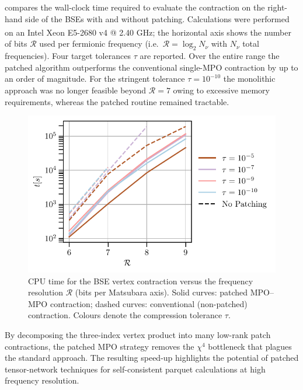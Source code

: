  compares the wall-clock time required to evaluate the contraction on the right-hand side of the BSEs with and without patching.  
Calculations were performed on an
Intel\textsuperscript{\textregistered} Xeon\textsuperscript{\textregistered}
E5-2680 v4 @ 2.40 GHz; the horizontal axis shows the number of bits \(\mathcal R\) used per fermionic frequency (i.e.\ \(\mathcal R=\log_{2}N_{\nu}\) with $N_{\nu}$ total frequencies). Four target tolerances \(\tau\) are reported.  
Over the entire range the patched algorithm outperforms the conventional single-MPO contraction by up to an order of magnitude.  
For the stringent tolerance \(\tau=10^{-10}\) the monolithic approach was no longer feasible beyond \(\mathcal R=7\) owing to excessive memory requirements, whereas the patched routine remained tractable.


\begin{figure}[ht!]
    \includegraphics{figures/BSEContraction_R_vs_time_comparTCI.pdf}
    \caption{CPU time for the BSE vertex contraction versus the frequency resolution
    \(\mathcal R\) (bits per Matsubara axis).
    Solid curves: patched MPO–MPO contraction;
    dashed curves: conventional (non-patched) contraction. Colours denote the compression tolerance \(\tau\).}
    \label{fig:BSEresult}
\end{figure}

By decomposing the three-index vertex product into many low-rank patch contractions, the patched MPO strategy removes the \(\chi^{4}\) bottleneck that plagues the standard approach.  
The resulting speed-up highlights the potential of patched tensor-network techniques for
self-consistent parquet calculations at high frequency resolution.


